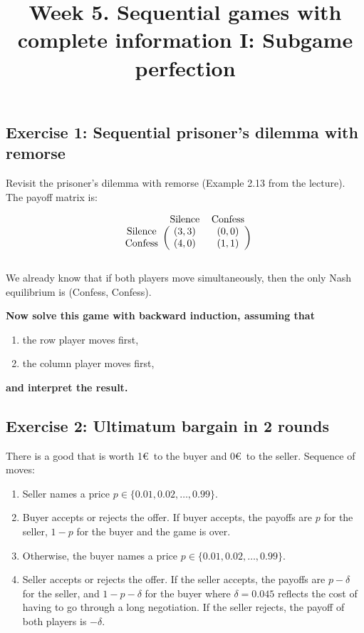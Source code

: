 \documentclass[10pt]{article}
\title{\textbf{Week 5.} Sequential games with complete information I: Subgame perfection}
\date{}
\begin{document}
\maketitle


\subsection*{Exercise 1: Sequential prisoner's dilemma with remorse}

Revisit the prisoner's dilemma with remorse (Example 2.13 from the lecture). The
payoff matrix is:

\begin{equation*}
    \begin{blockarray}{ccc}
        & \text{Silence} & \text{Confess} \\
        \begin{block}{c(cc)}
            \text{Silence} & (3, 3) & (0, 0) \\
            \text{Confess} & (4, 0) & (1, 1) \\
        \end{block}
    \end{blockarray}
\end{equation*}

We already know that if both players move simultaneously, then the only Nash
equilibrium is (Confess, Confess).

\textbf{Now solve this game with backward induction, assuming that}

\begin{enumerate}
    \item the row player moves first,
    \item the column player moves first,
\end{enumerate}

\textbf{and interpret the result.}

\subsection*{Exercise 2: Ultimatum bargain in 2 rounds}

There is a good that is worth 1\euro~to the buyer and 0\euro~to the seller.
Sequence of moves:

\begin{enumerate}
    \item Seller names a price \(p \in \{0.01, 0.02, \dots, 0.99\}\).
    \item Buyer accepts or rejects the offer. If buyer accepts, the payoffs are
    \(p\) for the seller, \(1 - p\) for the buyer and the game is over.
    \item Otherwise, the buyer names a price \(p \in \{0.01, 0.02, \dots,
    0.99\}\).
    \item Seller accepts or rejects the offer. If the seller accepts, the
    payoffs are \(p - \delta\) for the seller, and \(1 - p - \delta\) for the buyer
    where \(\delta=0.045\) reflects the cost of having to go through a long
    negotiation. If the seller rejects, the payoff of both players is
    \(-\delta\).
\end{enumerate}
\end{document}
